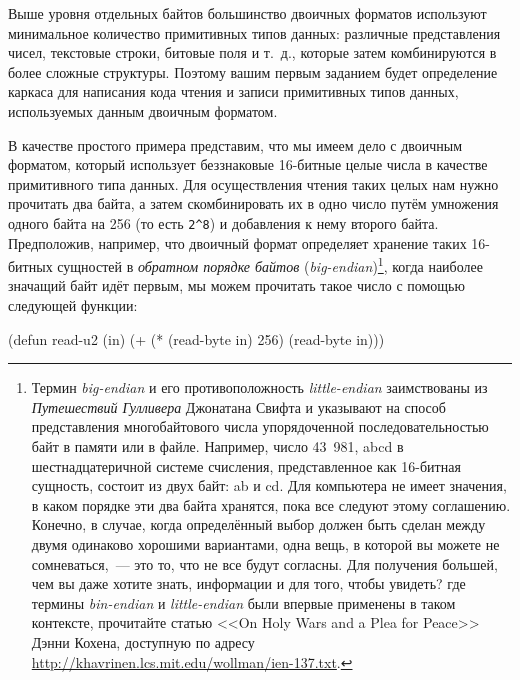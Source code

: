 Выше уровня отдельных байтов большинство двоичных форматов используют минимальное
количество примитивных типов данных: различные представления чисел, текстовые строки,
битовые поля и т.~д., которые затем комбинируются в более сложные структуры. Поэтому
вашим первым заданием будет определение каркаса для написания кода чтения и записи
примитивных типов данных, используемых данным двоичным форматом.

В качестве простого примера представим, что мы имеем дело с двоичным форматом, который
использует беззнаковые 16-битные целые числа в качестве примитивного типа данных. Для
осуществления чтения таких целых нам нужно прочитать два байта, а затем скомбинировать их
в одно число путём умножения одного байта на 256 (то есть \lstinline!2^8!) и добавления к
нему второго байта. Предположив, например, что двоичный формат определяет хранение таких
16-битных сущностей в \textit{обратном порядке байтов}
(\textit{big-endian})\footnote{Термин \textit{big-endian} и его противоположность
  \textit{little-endian} заимствованы из \textit{Путешествий Гулливера} Джонатана Свифта и
  указывают на способ представления многобайтового числа упорядоченной последовательностью
  байт в памяти или в файле. Например, число 43~981, abcd в шестнадцатеричной системе
  счисления, представленное как 16-битная сущность, состоит из двух байт: ab и cd. Для
  компьютера не имеет значения, в каком порядке эти два байта хранятся, пока все следуют
  этому соглашению. Конечно, в случае, когда определённый выбор должен быть сделан между
  двумя одинаково хорошими вариантами, одна вещь, в которой вы можете не сомневаться,~--- это
  то, что не все будут согласны. Для получения большей, чем вы даже хотите знать,
  информации и для того, чтобы увидеть? где термины \textit{bin-endian} и
  \textit{little-endian} были впервые применены в таком контексте, прочитайте статью <<On
  Holy Wars and a Plea for Peace>> Дэнни Кохена, доступную по адресу
  \url{http://khavrinen.lcs.mit.edu/wollman/ien-137.txt}.}, когда наиболее значащий байт идёт
первым, мы можем прочитать такое число с помощью следующей функции:

\begin{myverb}
(defun read-u2 (in)
  (+ (* (read-byte in) 256) (read-byte in)))
\end{myverb}


